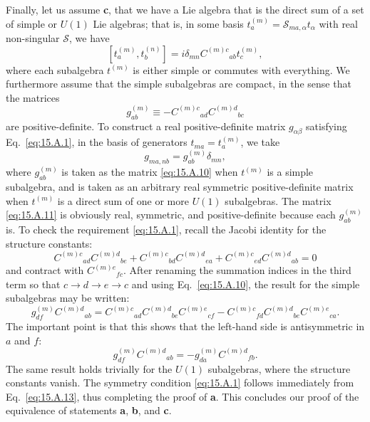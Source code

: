 Finally, let us assume \textbf{c}, that we have a Lie algebra that is the direct sum of a set of simple or $U(1)$ Lie algebras; that is, in some basis $t_a^{(m)}=\mathcal S_{ma,\alpha}t_\alpha$ with real non-singular $\mathcal S$, we have
\[
 [t_a^{(m)},t_b^{(n)}]
 =i\delta_{mn}C^{(m)c}{}_{ab}t_c^{(m)},
\]
where each subalgebra $t^{(m)}$ is either simple or commutes with everything. We furthermore assume that the simple subalgebras are compact, in the sense that the matrices
\begin{equation}
 g_{ab}^{(m)}\equiv-C^{(m)c}{}_{ad}C^{(m)d}{}_{bc}
 \tag{15.A.10}\label{eq:15.A.10}
\end{equation}
are positive-definite. To construct a real positive-definite matrix $g_{\alpha\beta}$ satisfying Eq.~\eqref{eq:15.A.1}, in the basis of generators $t_{ma}=t_a^{(m)}$, we take
\begin{equation}
 g_{ma,nb}=g_{ab}^{(m)}\delta_{mn},
 \tag{15.A.11}\label{eq:15.A.11}
\end{equation}
where $g_{ab}^{(m)}$ is taken as the matrix \eqref{eq:15.A.10} when $t^{(m)}$ is a simple subalgebra, and is taken as an arbitrary real symmetric positive-definite matrix when $t^{(m)}$ is a direct sum of one or more $U(1)$ subalgebras. The matrix \eqref{eq:15.A.11} is obviously real, symmetric, and positive-definite because each $g_{ab}^{(m)}$ is. To check the requirement \eqref{eq:15.A.1}, recall the Jacobi identity for the structure constants:
\begin{equation}
 C^{(m)c}{}_{ad}C^{(m)d}{}_{be}
 +C^{(m)c}{}_{bd}C^{(m)d}{}_{ea}
 +C^{(m)c}{}_{ed}C^{(m)d}{}_{ab}=0
 \tag{15.A.12}\label{eq:15.A.12}
\end{equation}
and contract with $C^{(m)e}{}_{fc}$. After renaming the summation indices in the third term so that $c\longrightarrow d\longrightarrow e\longrightarrow c$ and using Eq.~\eqref{eq:15.A.10}, the result for the simple subalgebras may be written:
\[
 g_{df}^{(m)}C^{(m)d}{}_{ab}
 =C^{(m)c}{}_{ad}C^{(m)d}{}_{be}C^{(m)e}{}_{cf}
 -C^{(m)c}{}_{fd}C^{(m)d}{}_{be}C^{(m)e}{}_{ca}.
\]
The important point is that this shows that the left-hand side is antisymmetric in $a$ and $f$:
\begin{equation}
 g_{df}^{(m)}C^{(m)d}{}_{ab}
 =-g_{da}^{(m)}C^{(m)d}{}_{fb}.
 \tag{15.A.13}\label{eq:15.A.13}
\end{equation}
The same result holds trivially for the $U(1)$ subalgebras, where the structure constants vanish. The symmetry condition \eqref{eq:15.A.1} follows immediately from Eq.~\eqref{eq:15.A.13}, thus completing the proof of \textbf{a}. This concludes our proof of the equivalence of statements \textbf{a}, \textbf{b}, and \textbf{c}.

